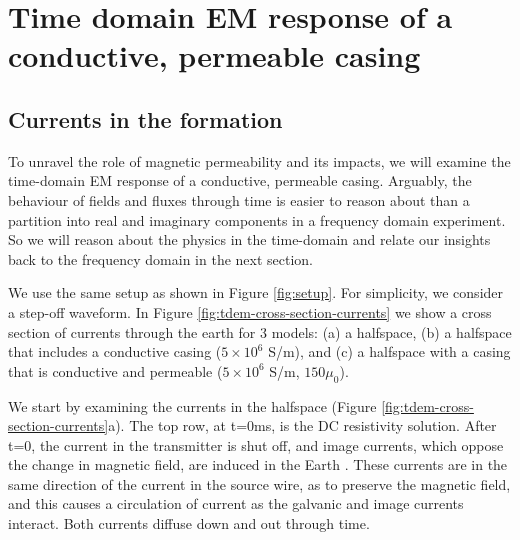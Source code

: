\documentclass[onecolumn, extra, mreferee]{gji}
\begin{document}
\section{Time domain EM response of a conductive, permeable casing}
\label{sec:tdem}

\subsection{Currents in the formation}

To unravel the role of magnetic permeability and its impacts, we will examine the time-domain EM response of a conductive, permeable casing. Arguably, the behaviour of fields and fluxes through time is easier to reason about than a partition into real and imaginary components in a frequency domain experiment. So we will reason about the physics in the time-domain and relate our insights back to the frequency domain in the next section.

We use the same setup as shown in Figure \ref{fig:setup}. For simplicity, we consider a step-off waveform. In Figure \ref{fig:tdem-cross-section-currents} we show a cross section of currents through the earth for 3 models: (a) a halfspace, (b) a halfspace that includes a conductive casing ($5\times10^6$ S/m), and (c) a halfspace with a casing that is conductive and permeable ($5\times10^6$ S/m, $150\mu_0$).

We start by examining the currents in the halfspace (Figure \ref{fig:tdem-cross-section-currents}a). The top row, at t=0ms, is the DC resistivity solution. After t=0, the current in the transmitter is shut off, and image currents, which oppose the change in magnetic field, are induced in the Earth \citep{nabighian_quasi-static_1979}. These currents are in the same direction of the current in the source wire, as to preserve the magnetic field, and this causes a circulation of current as the galvanic and image currents interact. Both currents diffuse down and out through time.



\end{document}
